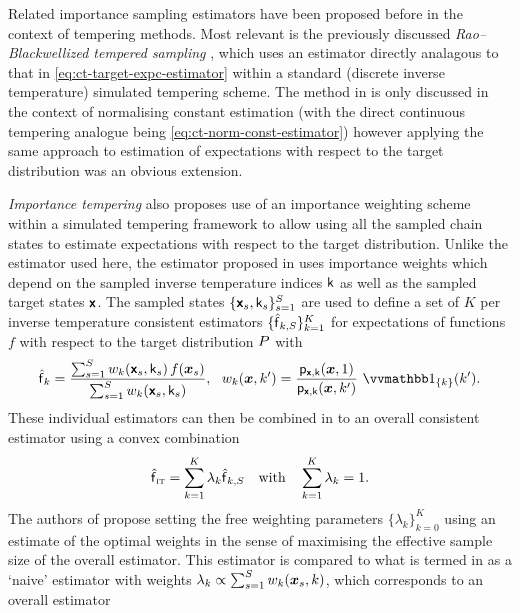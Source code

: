Related importance sampling estimators have been proposed before in the context of tempering methods. Most relevant is the previously discussed \emph{Rao--Blackwellized tempered sampling}  \citep{carlson2016partition}, which uses an estimator directly analagous to that in \eqref{eq:ct-target-expc-estimator} within a standard (discrete inverse temperature) simulated tempering scheme. The method in \citep{carlson2016partition} is only discussed in the context of normalising constant estimation (with the direct continuous tempering analogue being \eqref{eq:ct-norm-const-estimator}) however applying the same approach to estimation of expectations with respect to the target distribution was an obvious extension.

\emph{Importance tempering} \citep{gramacy2010importance} also proposes use of an importance weighting scheme within a simulated tempering framework to allow using all the sampled chain states to estimate expectations with respect to the target distribution. Unlike the estimator used here, the estimator proposed in \citep{gramacy2010importance} uses importance weights which depend on the sampled inverse temperature indices $\mathsf{k}$ as well as the sampled target states $\boldsymbol{\mathsf{x}}$. The sampled states $\lbrace \boldsymbol{\mathsf{x}}_s,\mathsf{k}_s\rbrace_{s=1}^S$ are used to define a set of $K$ per inverse temperature consistent estimators $\lbrace \hatf_{k,S} \rbrace_{k=1}^K$ for expectations of functions $f$ with respect to the target distribution $P$ with
\begin{equation}
  \hatf_{k} = \frac{\sum_{s=1}^S w_k(\rvct{x}_s,\rvar{k}_s)\,f(\vct{x}_s)}{\sum_{s=1}^S w_k(\rvct{x}_s,\rvar{k}_s)},
  ~~
  w_k(\vct{x},k') = \frac{\pden{\rvct{x},\rvar{k}}(\vct{x}, 1)}{\pden{\rvct{x},\rvar{k}}(\vct{x}, k')} \,\ind{\fset{k}}(k').
\end{equation}
These individual estimators can then be combined in to an overall consistent estimator using a convex combination
\begin{equation}
  \hatf_{\textsc{it}} = \sum_{k=1}^K \lambda_k \hatf_{k,S}
  \quad\textrm{with}\quad
  \sum_{k=1}^K \lambda_k = 1.
\end{equation}
The authors of \citep{gramacy2010importance} propose setting the free weighting parameters $\lbrace \lambda_k \rbrace_{k=0}^K$ using an estimate of the optimal weights in the sense of maximising the effective sample size of the overall estimator. This estimator is compared to what is termed in \citep{gramacy2010importance} as a `naive' estimator with weights $\lambda_k \propto \sum_{s=1}^S w_k(\boldsymbol{x}_s,k)$, which corresponds to an overall estimator
